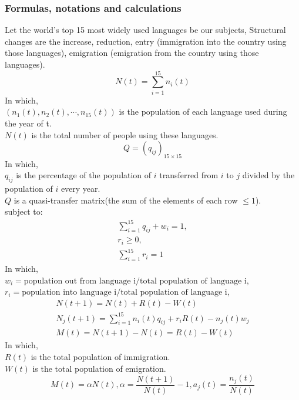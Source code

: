 \documentclass{mcmthesis}
\begin{document}
\subsubsection{Formulas, notations and calculations}
\hspace*{8mm}Let the world's top 15 most widely used languages be our subjects, Structural changes are the increase, reduction, entry (immigration into the country using those languages), emigration (emigration from the country using those languages). 
\begin{equation}
N(t)=\sum_{i=1}^{15}{n_i(t)}
\end{equation}
In which, \\
$(n_1(t),n_2(t),\cdots,n_{15}(t))$ is the population of each language used during the year of t. \\
$N(t)$ is the total number of people using these languages. \\
\begin{equation}
Q=(q_{ij})_{15\times15}
\end{equation}
In which, \\
$q_{ij}$ is the percentage of the population of $i$ transferred from $i$ to $j$ divided by the population of $i$ every year. \\
$Q$ is a quasi-transfer matrix(the sum of the elements of each row $ \leq 1$). \\
subject to:
\begin{eqnarray}
\sum_{i=1}^{15}{q_{ij}}+w_i=1, \\
r_i \geq 0, \\
\sum_{i=1}^{15}{r_i}=1
\end{eqnarray}
In which, \\
$w_i = {\text{population out from language i}}/{\text{total population of language i}}$, \\
$r_i = {\text{population into language i}}/{\text{total population of language i}}$, \\
\begin{eqnarray}
N(t+1)=N(t)+R(t)-W(t) \\
N_j(t+1)=\sum_{i=1}^{15}{n_i(t) q_{ij}}+r_i R(t)-n_j(t) w_j \\
M(t)=N(t+1)-N(t)=R(t)-W(t)
\end{eqnarray}
In which, \\
$R(t)$ is the total population of immigration. \\
$W(t)$ is the total population of emigration. \\
\begin{equation}
M(t)=\alpha N(t), \alpha=\frac{N(t+1)}{N(t)}-1, a_j(t)=\frac{n_j(t)}{N(t)}
\end{equation}
\end{document}
